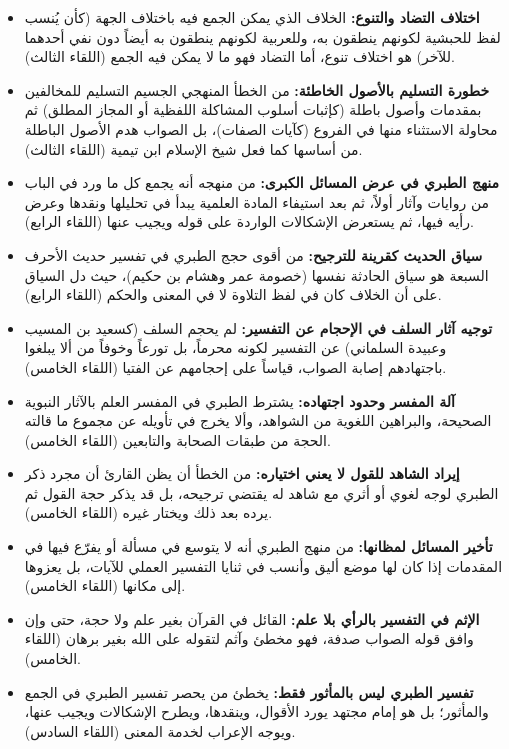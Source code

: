 \begin{itemize}
    \item \textbf{اختلاف التضاد والتنوع:} الخلاف الذي يمكن الجمع فيه باختلاف الجهة (كأن يُنسب لفظ للحبشية لكونهم ينطقون به، وللعربية لكونهم ينطقون به أيضاً دون نفي أحدهما للآخر) هو اختلاف تنوع، أما التضاد فهو ما لا يمكن فيه الجمع (اللقاء الثالث).
    \item \textbf{خطورة التسليم بالأصول الخاطئة:} من الخطأ المنهجي الجسيم التسليم للمخالفين بمقدمات وأصول باطلة (كإثبات أسلوب المشاكلة اللفظية أو المجاز المطلق) ثم محاولة الاستثناء منها في الفروع (كآيات الصفات)، بل الصواب هدم الأصول الباطلة من أساسها كما فعل شيخ الإسلام ابن تيمية (اللقاء الثالث).
    \item \textbf{منهج الطبري في عرض المسائل الكبرى:} من منهجه أنه يجمع كل ما ورد في الباب من روايات وآثار أولاً، ثم بعد استيفاء المادة العلمية يبدأ في تحليلها ونقدها وعرض رأيه فيها، ثم يستعرض الإشكالات الواردة على قوله ويجيب عنها (اللقاء الرابع).
    \item \textbf{سياق الحديث كقرينة للترجيح:} من أقوى حجج الطبري في تفسير حديث الأحرف السبعة هو سياق الحادثة نفسها (خصومة عمر وهشام بن حكيم)، حيث دل السياق على أن الخلاف كان في لفظ التلاوة لا في المعنى والحكم (اللقاء الرابع).
    \item \textbf{توجيه آثار السلف في الإحجام عن التفسير:} لم يحجم السلف (كسعيد بن المسيب وعبيدة السلماني) عن التفسير لكونه محرماً، بل تورعاً وخوفاً من ألا يبلغوا باجتهادهم إصابة الصواب، قياساً على إحجامهم عن الفتيا (اللقاء الخامس).
    \item \textbf{آلة المفسر وحدود اجتهاده:} يشترط الطبري في المفسر العلم بالآثار النبوية الصحيحة، والبراهين اللغوية من الشواهد، وألا يخرج في تأويله عن مجموع ما قالته الحجة من طبقات الصحابة والتابعين (اللقاء الخامس).
    \item \textbf{إيراد الشاهد للقول لا يعني اختياره:} من الخطأ أن يظن القارئ أن مجرد ذكر الطبري لوجه لغوي أو أثري مع شاهد له يقتضي ترجيحه، بل قد يذكر حجة القول ثم يرده بعد ذلك ويختار غيره (اللقاء الخامس).
    \item \textbf{تأخير المسائل لمظانها:} من منهج الطبري أنه لا يتوسع في مسألة أو يفرّع فيها في المقدمات إذا كان لها موضع أليق وأنسب في ثنايا التفسير العملي للآيات، بل يعزوها إلى مكانها (اللقاء الخامس).
    \item \textbf{الإثم في التفسير بالرأي بلا علم:} القائل في القرآن بغير علم ولا حجة، حتى وإن وافق قوله الصواب صدفة، فهو مخطئ وآثم لتقوله على الله بغير برهان (اللقاء الخامس).
    \item \textbf{تفسير الطبري ليس بالمأثور فقط:} يخطئ من يحصر تفسير الطبري في الجمع والمأثور؛ بل هو إمام مجتهد يورد الأقوال، وينقدها، ويطرح الإشكالات ويجيب عنها، ويوجه الإعراب لخدمة المعنى (اللقاء السادس).

\end{itemize}
